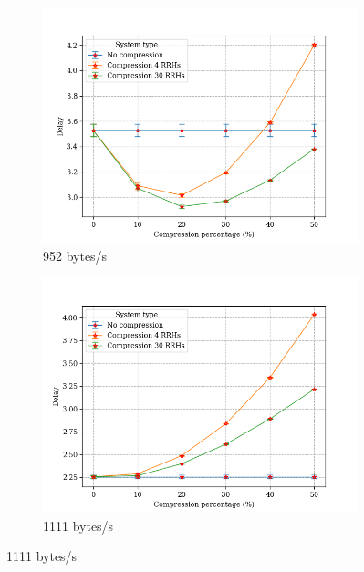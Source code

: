 \documentclass[11pt,a4paper,oneside, openright]{article}
\begin{document}
\begin{figure}[h]
	\centering
	\begin{subfigure}{.5\textwidth}
		\centering
		\includegraphics[width=\linewidth]{images/comp-s-952}
		\caption{952 bytes/s}
		\label{fig:comp-s-952}
	\end{subfigure}%
	\begin{subfigure}{.5\textwidth}
		\centering
		\includegraphics[width=\linewidth]{images/comp-s-1111}
		\caption{1111 bytes/s}
		\label{fig:comp-s-1111}
	\end{subfigure}%


\end{figure}
\end{document}

